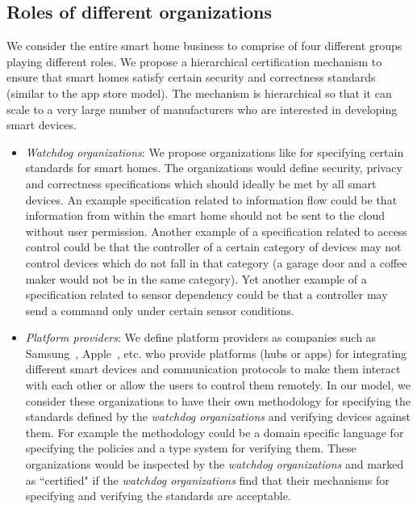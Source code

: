 \documentclass{article}
\begin{document}
\subsection{Roles of different organizations}
\label{subsec:roles}
We consider the entire smart home business to comprise of four different groups playing different roles. We propose a hierarchical certification mechanism to ensure that smart homes satisfy certain security and correctness standards (similar to the app store model). The  mechanism is hierarchical so that it can scale to a very large number of manufacturers who are interested in developing smart devices.   
\begin{itemize}[topsep=0pt,itemsep=0ex,partopsep=1ex,parsep=1ex]
\item \textit{Watchdog organizations}: We propose organizations like \cite{eff} for specifying certain standards for smart homes. The organizations would define security, privacy and correctness specifications which should ideally be met by all smart devices. An example specification related to information flow could be that information from within the smart home should not be sent to the cloud without user permission. Another example of a specification related to access control could be that the controller of a certain category of devices may not control devices which do not fall in that category (a garage door and a coffee maker would not be in the same category). Yet another example of a specification related to sensor dependency could be that a controller may send a command only under certain sensor conditions.
\item \textit{Platform providers}: We define platform providers as companies such as Samsung~\cite{samsung}, Apple~\cite{homekit}, etc. who provide platforms (hubs or apps) for integrating different smart devices and communication protocols to make them interact with each other or allow the users to control them remotely. In our model, we consider these organizations to have their own methodology for specifying the standards defined by the \textit{watchdog organizations} and verifying devices against them. For example the methodology could be a domain specific language for specifying the policies and a type system for verifying them. 
These organizations would be inspected by the \textit{watchdog organizations} and marked as ``certified" if the \textit{watchdog organizations} find that their mechanisms for specifying and verifying the standards are acceptable.



\end{itemize}
\end{document}
